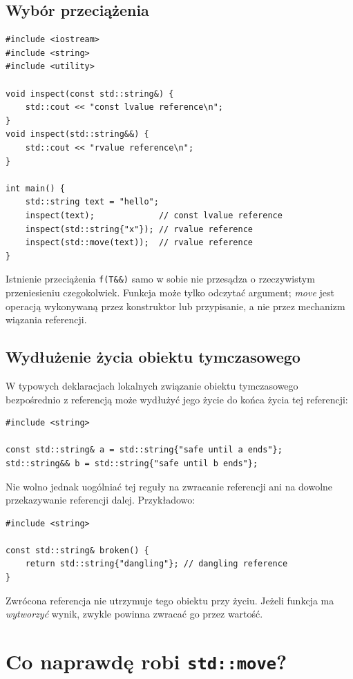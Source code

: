 \subsection{Wybór przeciążenia}

\begin{lstlisting}
#include <iostream>
#include <string>
#include <utility>

void inspect(const std::string&) {
    std::cout << "const lvalue reference\n";
}
void inspect(std::string&&) {
    std::cout << "rvalue reference\n";
}

int main() {
    std::string text = "hello";
    inspect(text);             // const lvalue reference
    inspect(std::string{"x"}); // rvalue reference
    inspect(std::move(text));  // rvalue reference
}
\end{lstlisting}

Istnienie przeciążenia \texttt{f(T\&\&)} samo w sobie nie przesądza
o rzeczywistym przeniesieniu czegokolwiek. Funkcja może tylko
odczytać argument; \emph{move} jest operacją wykonywaną przez
konstruktor lub przypisanie, a nie przez mechanizm wiązania referencji.

\subsection{Wydłużenie życia obiektu tymczasowego}

W typowych deklaracjach lokalnych związanie obiektu tymczasowego
bezpośrednio z referencją może wydłużyć jego życie do końca życia
tej referencji:
\begin{lstlisting}
#include <string>

const std::string& a = std::string{"safe until a ends"};
std::string&& b = std::string{"safe until b ends"};
\end{lstlisting}
Nie wolno jednak uogólniać tej reguły na zwracanie referencji ani
na dowolne przekazywanie referencji dalej. Przykładowo:
\begin{lstlisting}
#include <string>

const std::string& broken() {
    return std::string{"dangling"}; // dangling reference
}
\end{lstlisting}
Zwrócona referencja nie utrzymuje tego obiektu przy życiu.
Jeżeli funkcja ma \emph{wytworzyć} wynik, zwykle powinna zwracać go
przez wartość.

\section{Co naprawdę robi \texttt{std::move}?}

